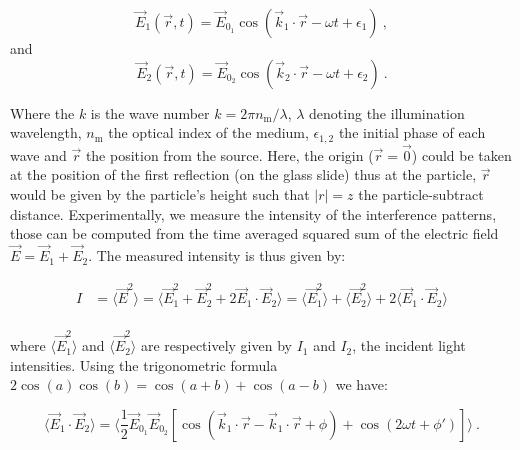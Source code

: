 \begin{equation}
	\vec{E}_1(\vec{r}, t) = \vec{E}_{0_1} \cos(\vec{k}_1 \cdot \vec{r} - \omega t + \epsilon_1) ~,
\end{equation}
and
\begin{equation}
	\vec{E}_2(\vec{r}, t) = \vec{E}_{0_2} \cos (\vec{k}_2 \cdot \vec{r} - \omega t + \epsilon_2) ~.
\end{equation}



Where the $k$ is the wave number $k=2\pi n_{\mathrm{m}}/\lambda$, $\lambda$ denoting the illumination wavelength, $n_\mathrm{m}$ the optical index of the medium, $\epsilon_{1,2}$ the initial phase of each wave and $\vec{r}$ the position from the source. Here, the origin ($\vec{r} = \vec{0}$) could be taken at the position of the first reflection (on the glass slide) thus at the particle, $\vec{r}$ would be given by the particle's height such that $|r| = z$ the particle-subtract distance. Experimentally, we measure the intensity of the interference patterns, those can be computed from the time averaged squared sum of the electric field $\vec{E} = \vec{E}_1 + \vec{E}_2$. The measured intensity is thus given by:

\begin{equation}
	\begin{aligned}
		I & = \langle \vec{E}^2 \rangle = \langle \vec{E}_1^2 + \vec{E}_2^2 + 2\vec{E}_1 \cdot \vec{E}_2 \rangle 
		= \langle \vec{E}_1^2 \rangle + \langle \vec{E}_2^2 \rangle  + 2 \langle \vec{E}_1 \cdot \vec{E}_2 \rangle \\
	\end{aligned}
\end{equation} 

where $ \langle \vec{E}_1^2 \rangle $ and  $\langle \vec{E}_2^2 \rangle$ are respectively given by $I_1$ and $I_2$, the incident light intensities. Using the trigonometric formula $2 \cos (a)\cos (b) = \cos (a+b) + \cos (a-b) $ we have:

\begin{equation}
	\langle  
	\vec{E}_1 \cdot \vec{E}_2 \rangle = 
	\langle
	\frac{1}{2} \vec{E}_{0_1}  \vec{E}_{0_2} 
	\left[
		\cos 
		\left(
			\vec{k}_1 \cdot \vec{r} - \vec{k}_1 \cdot \vec{r} + \phi	
		\right)	
		+ 
		\cos
		\left(
			2\omega t + \phi'
		\right)
	\right]
	\rangle~.
\end{equation}

